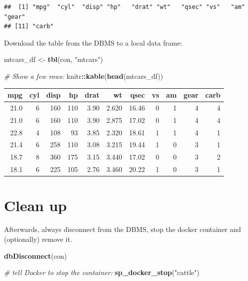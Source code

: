 \documentclass[]{book}
\newenvironment{Shaded}{\begin{snugshade}}{\end{snugshade}}
\newcommand{\CommentTok}[1]{\textcolor[rgb]{0.56,0.35,0.01}{\textit{#1}}}
\newcommand{\KeywordTok}[1]{\textcolor[rgb]{0.13,0.29,0.53}{\textbf{#1}}}
\newcommand{\NormalTok}[1]{#1}
\newcommand{\OperatorTok}[1]{\textcolor[rgb]{0.81,0.36,0.00}{\textbf{#1}}}
\newcommand{\StringTok}[1]{\textcolor[rgb]{0.31,0.60,0.02}{#1}}
\theoremstyle{definition}
\theoremstyle{definition}
\theoremstyle{definition}
\theoremstyle{remark}
\begin{document}
\begin{verbatim}
##  [1] "mpg"  "cyl"  "disp" "hp"   "drat" "wt"   "qsec" "vs"   "am"   "gear"
## [11] "carb"
\end{verbatim}

Download the table from the DBMS to a local data frame:

\begin{Shaded}
\begin{Highlighting}[]
\NormalTok{mtcars_df <-}\StringTok{ }\KeywordTok{tbl}\NormalTok{(con, }\StringTok{"mtcars"}\NormalTok{)}

\CommentTok{# Show a few rows:}
\NormalTok{knitr}\OperatorTok{::}\KeywordTok{kable}\NormalTok{(}\KeywordTok{head}\NormalTok{(mtcars_df))}
\end{Highlighting}
\end{Shaded}

\begin{tabular}{r|r|r|r|r|r|r|r|r|r|r}
\hline
mpg & cyl & disp & hp & drat & wt & qsec & vs & am & gear & carb\\
\hline
21.0 & 6 & 160 & 110 & 3.90 & 2.620 & 16.46 & 0 & 1 & 4 & 4\\
\hline
21.0 & 6 & 160 & 110 & 3.90 & 2.875 & 17.02 & 0 & 1 & 4 & 4\\
\hline
22.8 & 4 & 108 & 93 & 3.85 & 2.320 & 18.61 & 1 & 1 & 4 & 1\\
\hline
21.4 & 6 & 258 & 110 & 3.08 & 3.215 & 19.44 & 1 & 0 & 3 & 1\\
\hline
18.7 & 8 & 360 & 175 & 3.15 & 3.440 & 17.02 & 0 & 0 & 3 & 2\\
\hline
18.1 & 6 & 225 & 105 & 2.76 & 3.460 & 20.22 & 1 & 0 & 3 & 1\\
\hline
\end{tabular}

\hypertarget{clean-up}{%
\section{Clean up}\label{clean-up}}

Afterwards, always disconnect from the DBMS, stop the docker container
and (optionally) remove it.

\begin{Shaded}
\begin{Highlighting}[]
\KeywordTok{dbDisconnect}\NormalTok{(con)}

\CommentTok{# tell Docker to stop the container:}
\KeywordTok{sp_docker_stop}\NormalTok{(}\StringTok{"cattle"}\NormalTok{)}
\end{Highlighting}
\end{Shaded}
\end{document}
